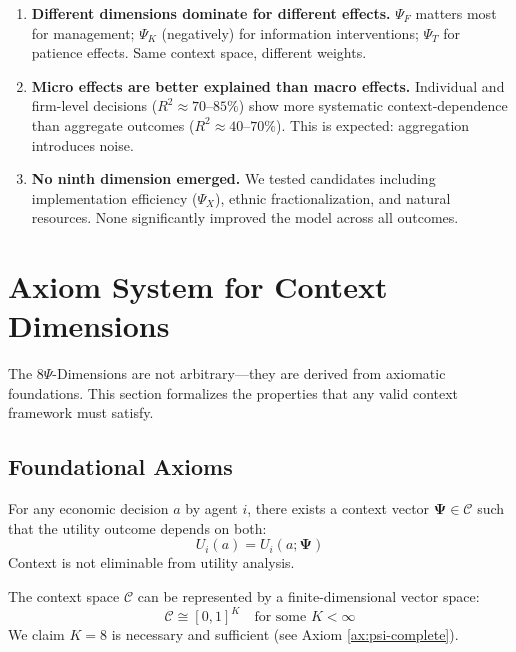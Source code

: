 \begin{enumerate}
    \item \textbf{Different dimensions dominate for different effects.} $\Psi_F$ matters most for management; $\Psi_K$ (negatively) for information interventions; $\Psi_T$ for patience effects. Same context space, different weights.
    
    \item \textbf{Micro effects are better explained than macro effects.} Individual and firm-level decisions ($R^2 \approx 70$--$85\%$) show more systematic context-dependence than aggregate outcomes ($R^2 \approx 40$--$70\%$). This is expected: aggregation introduces noise.
    
    \item \textbf{No ninth dimension emerged.} We tested candidates including implementation efficiency ($\Psi_X$), ethnic fractionalization, and natural resources. None significantly improved the model across all outcomes.
\end{enumerate}




\section{Axiom System for Context Dimensions}
\label{sec:V-axioms}

The 8$\Psi$-Dimensions are not arbitrary---they are derived from axiomatic 
foundations. This section formalizes the properties that any valid context 
framework must satisfy.

\subsection{Foundational Axioms}

\begin{axiom}
\label{ax:psi-exist}
For any economic decision $a$ by agent $i$, there exists a context vector 
$\boldsymbol{\Psi} \in \mathcal{C}$ such that the utility outcome depends on both:
\[
U_i(a) = U_i(a; \boldsymbol{\Psi})
\]
Context is not eliminable from utility analysis.
\end{axiom}

\begin{axiom}
\label{ax:psi-dim}
The context space $\mathcal{C}$ can be represented by a finite-dimensional 
vector space:
\[
\mathcal{C} \cong [0,1]^K \quad \text{for some } K < \infty
\]
We claim $K = 8$ is necessary and sufficient (see Axiom \ref{ax:psi-complete}).
\end{axiom}

